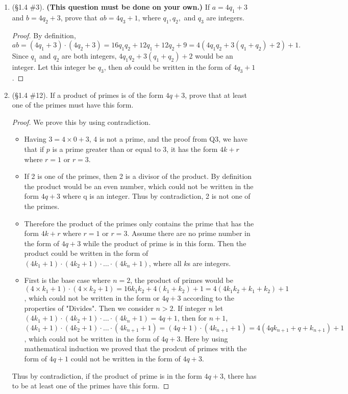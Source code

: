 \documentclass[11pt,a4paper]{article}
\begin{document}
\begin{enumerate}
	\item (\S 1.4 \#3). \textbf{(This question must be done on your own.)} If \(a = 4q_{1}+3 \) and \(b = 4q_{2}+3\), prove that \(ab = 4q_{3}+1\), where \(q_{1},q_{2},\) and \(q_{3}\) are integers.

	\begin{proof}
		By definition, $ab = (4q_1+3)\cdot (4q_2+3) = 16q_1q_2+12q_1+12q_2+9 = 4(4q_1q_2 + 3(q_1+q_2) + 2) + 1.$ Since $q_1$ and $q_2$ are both integers, $4q_1q_2 + 3(q_1+q_2) + 2$ would be an integer. Let this integer be $q_3$, then $ab$ could be written in the form of $4q_3+1$.
	\end{proof}

	\item (\S 1.4 \#12). If a product of primes is of the form \(4q+3\), prove that at least one of the primes must have this form.

	\begin{proof}  We prove this by using contradiction.
	\begin{itemize}
		\item Having $3= 4\times 0 + 3$, 4 is not a prime, and the proof from Q3, we have that if $p$ is a prime greater than or equal to 3, it has the form \(4k+r\) where \(r = 1\) or \(r = 3\).
		\item If 2 is one of the primes, then 2 is a divisor of the product. By definition the product would be an even number, which could not be written in the form $4q+3$ where q is an integer. Thus by contradiction, 2 is not one of the primes.
		\item Therefore the product of the primes only contains the prime that has the form \(4k+r\) where \(r = 1\) or \(r = 3\). Assume there are no prime number in the form of $4q+3$ while the product of prime is in this form. Then the product could be written in the form of $(4k_1+1)\cdot (4k_2+1) \cdot \ldots \cdot (4k_n+1)$, where all $k$s are integers.
		\item First is the base case where $n=2$, the product of primes would be $(4\times k_1 +1)\cdot (4\times k_2 +1) = 16k_1k_2 + 4(k_1+k_2)+1 = 4(4k_1k_2+ k_1 + k_2) + 1$, which could not be written in the form or $4q+3$ according to the properties of "Divides". Then we consider $n>2$. If integer $n$ let $(4k_1+1)\cdot (4k_2+1) \cdot \ldots \cdot (4k_n+1) = 4q + 1$, then for $n+1$, $(4k_1+1)\cdot (4k_2+1) \cdot \ldots \cdot (4k_{n+1}+1) = (4q + 1)\cdot (4k_{n+1}+1) = 4(4qk_{n+1}+ q + k_{n+1}) + 1$, which could not be written in the form of $4q+3$. Here by using mathematical induction we proved that the prodcut of primes with the form of $4q+1$ could not be written in the form of $4q+3$.
	\end{itemize}
		Thus by contradiction, if the product of prime is in the form $4q+3$, there has to be at least one of the primes have this form.
	\end{proof}

\end{enumerate}
\end{document}
